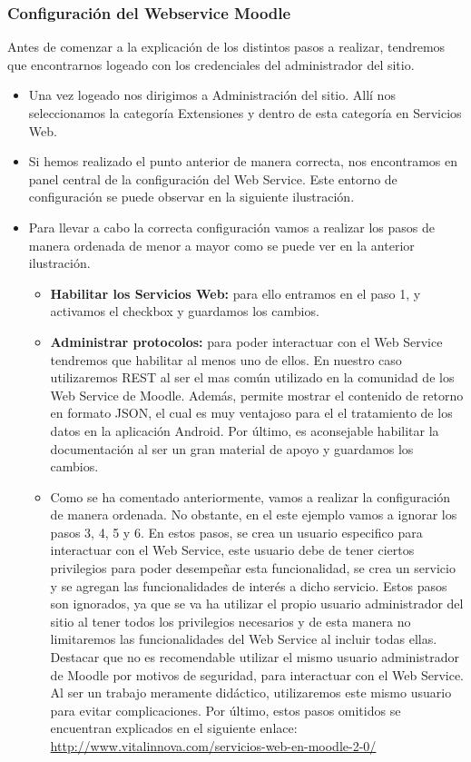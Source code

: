 \subsubsection{Configuración del Webservice Moodle}

Antes de comenzar a la explicación de los distintos pasos a realizar, tendremos que encontrarnos logeado con los credenciales del administrador del sitio.

\begin{itemize}

	\item Una vez logeado nos dirigimos a Administración del sitio. Allí nos seleccionamos la categoría Extensiones y dentro de esta categoría en Servicios Web.
	\item Si hemos realizado el punto anterior de manera correcta, nos encontramos en panel central de la configuración del Web Service. Este entorno de configuración se puede observar en la siguiente ilustración.
	
	\item Para llevar a cabo la correcta configuración vamos a realizar los pasos de manera ordenada de menor a mayor como se puede ver en la anterior ilustración. 
	\begin{itemize}
	
		\item \textbf{Habilitar los Servicios Web:} para ello entramos en el paso 1, y activamos el checkbox y guardamos los cambios.
		
		\item \textbf{Administrar protocolos:} para poder interactuar con el Web Service tendremos que habilitar al menos uno de ellos. En nuestro caso utilizaremos REST al ser el mas común utilizado en la comunidad de los Web Service de Moodle. Además, permite mostrar el contenido de retorno en formato JSON, el cual es muy ventajoso para el el tratamiento de los datos en la aplicación Android. Por último, es aconsejable habilitar la documentación al ser un gran material de apoyo y guardamos los cambios.
		
		\item Como se ha comentado anteriormente, vamos a realizar la configuración de manera ordenada. No obstante, en el este ejemplo vamos a ignorar los pasos 3, 4, 5 y 6. En estos pasos, se crea un usuario especifico para interactuar con el Web Service, este usuario debe de tener ciertos privilegios para poder desempeñar esta funcionalidad, se crea un servicio y se agregan las funcionalidades de interés a dicho servicio. Estos pasos son ignorados, ya que se va ha utilizar el propio usuario administrador del sitio al tener todos los privilegios necesarios y de esta manera no limitaremos las funcionalidades del Web Service al incluir todas ellas. Destacar que no es recomendable utilizar el mismo usuario administrador de Moodle por motivos de seguridad, para interactuar con el Web Service. Al ser un trabajo meramente didáctico, utilizaremos este mismo usuario para evitar complicaciones.
Por último, estos pasos omitidos se encuentran explicados en el siguiente enlace:
\url{http://www.vitalinnova.com/servicios-web-en-moodle-2-0/}
		

\end{itemize}
\end{itemize}
